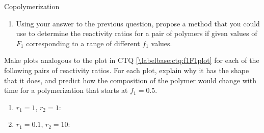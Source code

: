 \begin{activity}{Copolymerization}
\begin{ctqs}
\begin{enumerate}
			\item Using your answer to the previous question, propose a method that you could use to determine the reactivity ratios for a pair of polymers if given values of $F_1$ corresponding to a range of different $f_1$ values.
			
				\begin{solution}[2in]\end{solution}
		\end{enumerate}
\end{ctqs}


\begin{exercises}

	\exercise Make plots analogous to the plot in CTQ \ref{\labelbase:ctq:f1F1plot} for each of the following pairs of reactivity ratios.  For each plot, explain why it has the shape that it does, and predict how the composition of the polymer would change with time for a polymerization that starts at $f_1=0.5$.
	
		\begin{enumerate}
			\item $r_1=1$, $r_2=1$:
	
				\begin{solution}\end{solution}		

			\item $r_1=0.1$, $r_2=10$:
			
				\begin{solution}
\end{solution}
\end{enumerate}
\end{exercises}
\end{activity}

